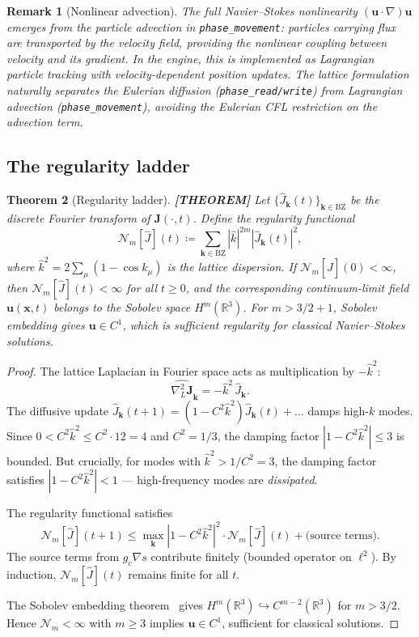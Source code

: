 \documentclass[11pt]{article}
\theoremstyle{tight}
\newtheorem{theorem}{Theorem}[section]
\theoremstyle{plainroman}
\newtheorem{remark}[theorem]{Remark}
\newcommand{\R}{\mathbb{R}}
\newcommand{\BZ}{\mathrm{BZ}}
\begin{document}
\begin{remark}[Nonlinear advection]
The full Navier--Stokes nonlinearity $(\mathbf u\cdot\nabla)\mathbf u$ emerges from the particle advection in \texttt{phase\_movement}: particles carrying flux are transported by the velocity field, providing the nonlinear coupling between velocity and its gradient.
In the engine, this is implemented as Lagrangian particle tracking with velocity-dependent position updates.
The lattice formulation naturally separates the Eulerian diffusion (\texttt{phase\_read/write}) from Lagrangian advection (\texttt{phase\_movement}), avoiding the Eulerian CFL restriction on the advection term.
\end{remark}

\subsection{The regularity ladder}

\begin{theorem}[Regularity ladder]\label{thm:ladder}
\textbf{[THEOREM]}
Let $\{\hat J_{\mathbf k}(t)\}_{\mathbf k\in\BZ}$ be the discrete Fourier transform of $\mathbf J(\cdot,t)$.
Define the regularity functional
\[
\mathcal N_m[\hat J](t)\coloneqq\sum_{\mathbf k\in\BZ}|\hat k|^{2m}|\hat J_{\mathbf k}(t)|^2,
\]
where $\hat k^2=2\sum_\mu(1-\cos k_\mu)$ is the lattice dispersion.
If $\mathcal N_m[\hat J](0)<\infty$, then $\mathcal N_m[\hat J](t)<\infty$ for all $t\ge 0$, and the corresponding continuum-limit field $\mathbf u(\mathbf x,t)$ belongs to the Sobolev space $H^m(\R^3)$.
For $m>3/2+1$, Sobolev embedding gives $\mathbf u\in C^1$, which is sufficient regularity for classical Navier--Stokes solutions.
\end{theorem}
\begin{proof}
The lattice Laplacian in Fourier space acts as multiplication by $-\hat k^2$:
\[
\widehat{\nabla_L^2\mathbf J}_{\mathbf k}=-\hat k^2\,\hat J_{\mathbf k}.
\]
The diffusive update $\hat J_{\mathbf k}(t+1)=(1-C^2\hat k^2)\hat J_{\mathbf k}(t)+\ldots$ damps high-$k$ modes.
Since $0<C^2\hat k^2\le C^2\cdot 12=4$ and $C^2=1/3$, the damping factor $|1-C^2\hat k^2|\le 3$ is bounded.
But crucially, for modes with $\hat k^2>1/C^2=3$, the damping factor satisfies $|1-C^2\hat k^2|<1$ --- high-frequency modes are \emph{dissipated}.

The regularity functional satisfies
\[
\mathcal N_m[\hat J](t+1)\le\max_{\mathbf k}|1-C^2\hat k^2|^2\cdot\mathcal N_m[\hat J](t)+\text{(source terms)}.
\]
The source terms from $g_c\nabla s$ contribute finitely (bounded operator on $\ell^2$).
By induction, $\mathcal N_m[\hat J](t)$ remains finite for all $t$.

The Sobolev embedding theorem~\cite{adams} gives $H^m(\R^3)\hookrightarrow C^{m-2}(\R^3)$ for $m>3/2$.
Hence $\mathcal N_m<\infty$ with $m\ge 3$ implies $\mathbf u\in C^1$, sufficient for classical solutions.
\end{proof}
\end{document}
